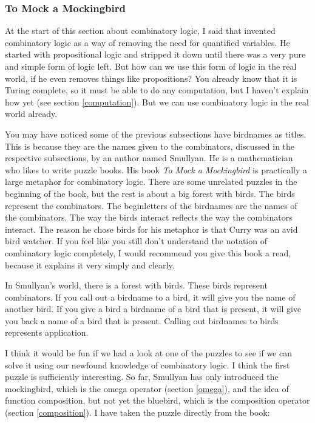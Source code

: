 \documentclass[11pt]{article}
\begin{document}
\subsubsection{To Mock a Mockingbird}

At the start of this section about combinatory logic, I said that
\textcite{schonfinkel1924} invented combinatory logic as a way of removing the
need for quantified variables. He started with propositional logic and stripped
it down until there was a very pure and simple form of logic left. But how can
we use this form of logic in the real world, if he even removes things like
propositions? You already know that it is Turing complete, so it must be able
to do any computation, but I haven't explain how yet (see section
\ref{computation}). But we can use combinatory logic in the real world already.

You may have noticed some of the previous subsections have birdnames as titles.
This is because they are the names given to the combinators, discussed in the
respective subsections, by an author named Smullyan. He is a mathematician who
likes to write puzzle books. His book \emph{To Mock a Mockingbird}
\parencite{smullyan2000} is practically a large metaphor for combinatory logic.
There are some unrelated puzzles in the beginning of the book, but the rest is
about a big forest with birds. The birds represent the combinators. The
beginletters of the birdnames are the names of the combinators. The way the
birds interact reflects the way the combinators interact. The reason he chose
birds for his metaphor is that Curry was an avid bird watcher. If you feel like
you still don't understand the notation of combinatory logic completely, I
would recommend you give this book a read, because it explains it very simply
and clearly.

In Smullyan's world, there is a forest with birds. These birds represent
combinators. If you call out a birdname to a bird, it will give you the name of
another bird. If you give a bird a birdname of a bird that is present, it will
give you back a name of a bird that is present. Calling out birdnames to birds
represents application.

I think it would be fun if we had a look at one of the puzzles to see if we can
solve it using our newfound knowledge of combinatory logic. I think the first
puzzle is sufficiently interesting. So far, Smullyan has only introduced the
mockingbird, which is the omega operator (section \ref{omega}), and the idea of
function composition, but not yet the bluebird, which is the composition
operator (section \ref{composition}). I have taken the puzzle directly from the
book:
\end{document}
